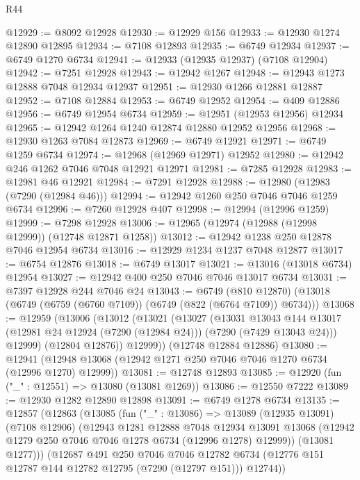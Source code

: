 \begin{lexlean}{R44}
\begin{coremodule}
{@12929 := @8092 @12928
@12930 := @12929 @156
@12933 := @12930 @1274 @12890 @12895
@12934 := @7108 @12893
@12935 := @6749 @12934
@12937 := @6749 @1270 @6734
@12941 := @12933 (@12935 @12937) (@7108 @12904)
@12942 := @7251 @12928
@12943 := @12942 @1267
@12948 := @12943 @1273 @12888 @7048 @12934 @12937
@12951 := @12930 @1266 @12881 @12887
@12952 := @7108 @12884
@12953 := @6749 @12952
@12954 := @409 @12886
@12956 := @6749 @12954 @6734
@12959 := @12951 (@12953 @12956) @12934
@12965 := @12942 @1264 @1240 @12874 @12880 @12952 @12956
@12968 := @12930 @1263 @7084 @12873
@12969 := @6749 @12921
@12971 := @6749 @1259 @6734
@12974 := @12968 (@12969 @12971) @12952
@12980 := @12942 @246 @1262 @7046 @7048 @12921 @12971
@12981 := @7285 @12928
@12983 := @12981 @46 @12921
@12984 := @7291 @12928
@12988 := @12980 (@12983 (@7290 (@12984 @46)))
@12994 := @12942 @1260 @250 @7046 @7046 @1259 @6734
@12996 := @7260 @12928 @407
@12998 := @12994 (@12996 @1259)
@12999 := @7298 @12928
@13006 := @12965 (@12974 (@12988 (@12998 @12999)) (@12748 @12871 @1258))
@13012 := @12942 @1238 @250 @12878 @7046 @12954 @6734
@13016 := @12929 @1234 @1237 @7048 @12877
@13017 := @6754 @12876
@13018 := @6749 @13017
@13021 := @13016 (@13018 @6734) @12954
@13027 := @12942 @400 @250 @7046 @7046 @13017 @6734
@13031 := @7397 @12928 @244 @7046 @24
@13043 := @6749
    (@810 @12870)
    (@13018 (@6749 (@6759 (@6760 @7109)) (@6749 (@822 (@6764 @7109)) @6734)))
@13068 := @12959
    (@13006
      (@13012
        (@13021
          (@13027
            (@13031
              @13043
              @144
              @13017
              (@12981 @24 @12924 (@7290 (@12984 @24)))
              (@7290 (@7429 @13043 @24)))
            @12999)
          (@12804 @12876))
        @12999))
    (@12748 @12884 @12886)
@13080 := @12941 (@12948 @13068 (@12942 @1271 @250 @7046 @7046 @1270 @6734 (@12996 @1270) @12999))
@13081 := @12748 @12893
@13085 := @12920 (fun ("_" : @12551) => @13080 (@13081 @1269))
@13086 := @12550 @7222
@13089 := @12930 @1282 @12890 @12898
@13091 := @6749 @1278 @6734
@13135 := @12857
    (@12863
      (@13085
        (fun ("_" : @13086) =>
        @13089
          (@12935 @13091)
          (@7108 @12906)
          (@12943
            @1281
            @12888
            @7048
            @12934
            @13091
            @13068
            (@12942 @1279 @250 @7046 @7046 @1278 @6734 (@12996 @1278) @12999))
          (@13081 @1277)))
      (@12687
        @491
        @250
        @7046
        @7046
        @12782
        @6734
        (@12776 @151 @12787 @144 @12782 @12795 (@7290 (@12797 @151)))
        @12744))
}
\end{coremodule}
\end{lexlean}

